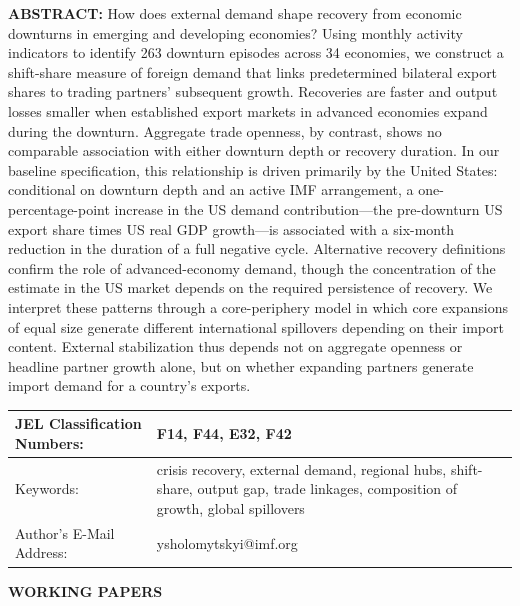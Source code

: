 \documentclass[12pt, a4paper]{article}
\begin{document}
\vspace{1cm}
\noindent \textbf{ABSTRACT:} How does external demand shape recovery from economic downturns in emerging and developing economies? Using monthly activity indicators to identify 263 downturn episodes across 34 economies, we construct a shift-share measure of foreign demand that links predetermined bilateral export shares to trading partners' subsequent growth. Recoveries are faster and output losses smaller when established export markets in advanced economies expand during the downturn. Aggregate trade openness, by contrast, shows no comparable association with either downturn depth or recovery duration. In our baseline specification, this relationship is driven primarily by the United States: conditional on downturn depth and an active IMF arrangement, a one-percentage-point increase in the US demand contribution---the pre-downturn US export share times US real GDP growth---is associated with a six-month reduction in the duration of a full negative cycle. Alternative recovery definitions confirm the role of advanced-economy demand, though the concentration of the estimate in the US market depends on the required persistence of recovery. We interpret these patterns through a core-periphery model in which core expansions of equal size generate different international spillovers depending on their import content. External stabilization thus depends not on aggregate openness or headline partner growth alone, but on whether expanding partners generate import demand for a country's exports.
\vspace{0.3cm}
\begin{table}[H]
    \small
    \begin{tabularx}{\textwidth}{@{}lX@{}}
        \toprule
        JEL Classification Numbers: & F14, F44, E32, F42 \\ \midrule
        Keywords: & crisis recovery, external demand, regional hubs, shift-share, output gap, trade linkages, composition of growth, global spillovers \\ \midrule
        Author's E-Mail Address: & ysholomytskyi@imf.org \\ \bottomrule
    \end{tabularx}
\end{table}

\clearpage

\vspace*{2cm}
{\color{gray!80} \Large \sffamily \textbf{WORKING PAPERS} \par}
\end{document}
